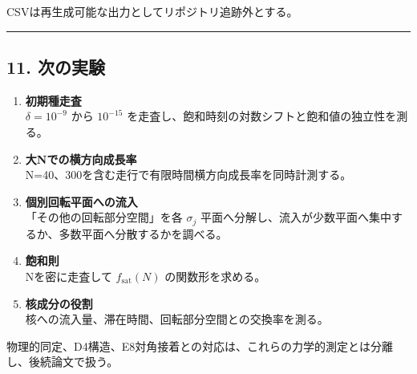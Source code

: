 \documentclass[
  a4paper,
]{ltjsarticle}
\begin{document}
CSVは再生成可能な出力としてリポジトリ追跡外とする。

\begin{center}\rule{0.5\linewidth}{0.5pt}\end{center}

\subsection{11. 次の実験}\label{ux6b21ux306eux5b9fux9a13}

\begin{enumerate}
\def\labelenumi{\arabic{enumi}.}
\item
  \textbf{初期種走査}\\
  \(\delta=10^{-9}\) から \(10^{-15}\)
  を走査し、飽和時刻の対数シフトと飽和値の独立性を測る。
\item
  \textbf{大Nでの横方向成長率}\\
  N=40、300を含む走行で有限時間横方向成長率を同時計測する。
\item
  \textbf{個別回転平面への流入}\\
  「その他の回転部分空間」を各 \(\sigma_j\)
  平面へ分解し、流入が少数平面へ集中するか、多数平面へ分散するかを調べる。
\item
  \textbf{飽和則}\\
  Nを密に走査して \(f_{\mathrm{sat}}(N)\) の関数形を求める。
\item
  \textbf{核成分の役割}\\
  核への流入量、滞在時間、回転部分空間との交換率を測る。
\end{enumerate}

物理的同定、D4構造、E8対角接着との対応は、これらの力学的測定とは分離し、後続論文で扱う。
\end{document}
